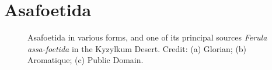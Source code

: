 


\section{Asafoetida}
\label{sec:asafoetida}



\begin{figure}[!ht]
	\vspace{-4ex}
	\centering
	\hfill
	\hfill
	\caption[Asafoetida in various forms.]{Asafoetida in various forms, and one of its principal sources \textit{Ferula assa-foetida} in the Kyzylkum Desert. Credit: (a) Glorian; (b) Aromatique; (c) Public Domain.}
	\label{fig:asafoetida_imgs}
\end{figure}

